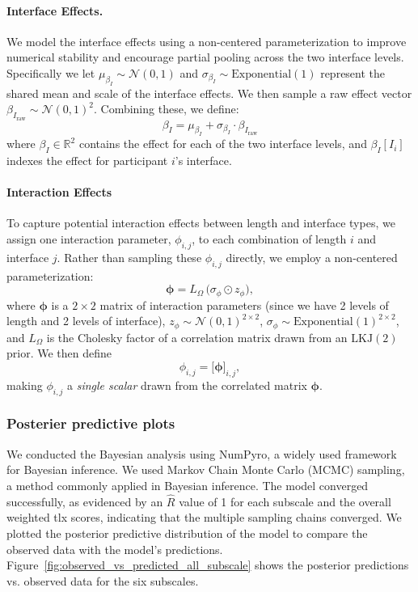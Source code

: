 \paragraph{Interface Effects.}
We model the interface effects using a non-centered parameterization to improve numerical stability and encourage partial pooling across the two interface levels. Specifically we let $\mu_{\beta_I} \sim \mathcal{N}(0,1)$ and $\sigma_{\beta_I} \sim \mathrm{Exponential}(1)$ represent the shared mean and scale of the interface effects. We then sample a raw effect vector $\beta_{I_{\text{raw}}} \sim \mathcal{N}(0,1)^2.$ Combining these, we define:
\begin{equation}
    \beta_I = \mu_{\beta_I} + \sigma_{\beta_I} \cdot \beta_{I_{\text{raw}}}
    \label{eq:interface_reparam}
\end{equation}
where $\beta_I \in \mathbb{R}^2$ contains the effect for each of the two interface levels, 
and $\beta_I[I_i]$ indexes the effect for participant $i$'s interface. 

\paragraph{Interaction Effects} To capture potential interaction effects between length and interface types, we assign one interaction parameter, $\phi_{i,j}$, to each combination of length $i$ and interface $j$. Rather than sampling these $\phi_{i,j}$ directly, we employ a non-centered parameterization:
\[
  \boldsymbol{\phi} = L_{\Omega} \,\bigl(\sigma_{\phi} \odot z_{\phi}\bigr),
\]
where \(\boldsymbol{\phi}\) is a $2 \times 2$ matrix of interaction parameters (since we have 2 levels of length and 2 levels of interface), $z_{\phi} \sim \mathcal{N}(0,1)^{2\times2}$, $\sigma_{\phi} \sim \text{Exponential}(1)^{2\times2}$, and $L_{\Omega}$ is the Cholesky factor of a correlation matrix drawn from an $\text{LKJ}(2)$ prior. We then define
\[
    \phi_{i,j} 
    = 
    \bigl[\boldsymbol{\phi}\bigr]_{i,j},
\]
making $\phi_{i,j}$ a \emph{single scalar} drawn from the correlated matrix $\boldsymbol{\phi}$.

\subsubsection{Posterier predictive plots}
We conducted the Bayesian analysis using NumPyro, a widely used framework for Bayesian inference. We used Markov Chain Monte Carlo (MCMC) sampling, a method commonly applied in Bayesian inference. The model converged successfully, as evidenced by an $\hat{R}$ value of 1 for each subscale and the overall weighted tlx scores, indicating that the multiple sampling chains converged. We plotted the posterior predictive distribution of the model to compare the observed data with the model's predictions. Figure~\ref{fig:observed_vs_predicted_all_subscale} shows the posterior predictions vs. observed data for the six subscales.

